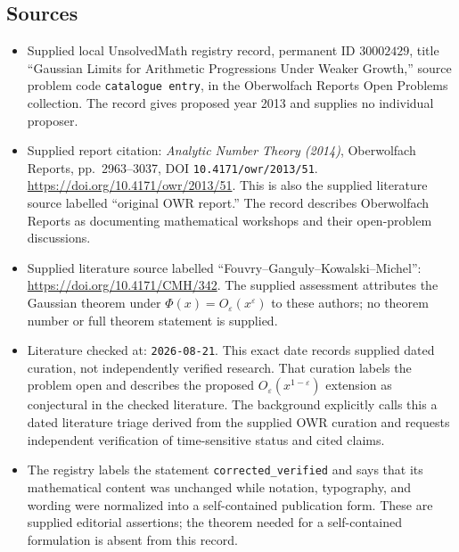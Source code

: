 \documentclass[11pt]{article}
\begin{document}
\subsection{Sources}
\begin{itemize}
\item Supplied local UnsolvedMath registry record, permanent ID \(30002429\), title ``Gaussian Limits for Arithmetic Progressions Under Weaker Growth,'' source problem code \texttt{catalogue entry}, in the Oberwolfach Reports Open Problems collection. The record gives proposed year 2013 and supplies no individual proposer.
\item Supplied report citation: \emph{Analytic Number Theory (2014)}, Oberwolfach Reports, pp.~2963--3037, DOI \texttt{10.4171/owr/2013/51}. \url{https://doi.org/10.4171/owr/2013/51}. This is also the supplied literature source labelled ``original OWR report.'' The record describes Oberwolfach Reports as documenting mathematical workshops and their open-problem discussions.
\item Supplied literature source labelled ``Fouvry--Ganguly--Kowalski--Michel'': \url{https://doi.org/10.4171/CMH/342}. The supplied assessment attributes the Gaussian theorem under \(\Phi(x)=O_{\varepsilon}(x^{\varepsilon})\) to these authors; no theorem number or full theorem statement is supplied.
\item Literature checked at: \texttt{2026-08-21}. This exact date records supplied dated curation, not independently verified research. That curation labels the problem open and describes the proposed \(O_{\varepsilon}(x^{1-\varepsilon})\) extension as conjectural in the checked literature. The background explicitly calls this a dated literature triage derived from the supplied OWR curation and requests independent verification of time-sensitive status and cited claims.
\item The registry labels the statement \texttt{corrected\_verified} and says that its mathematical content was unchanged while notation, typography, and wording were normalized into a self-contained publication form. These are supplied editorial assertions; the theorem needed for a self-contained formulation is absent from this record.
\end{itemize}
\end{document}
